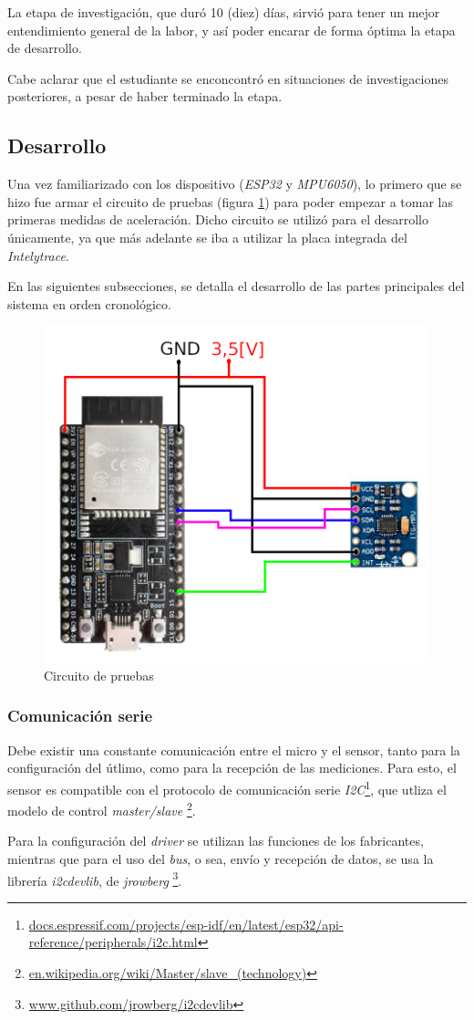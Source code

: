 \documentclass{article}
\newcommand{ \fnidosc }{\footnote{\url{docs.espressif.com/projects/esp-idf/en/latest/esp32/api-reference/peripherals/i2c.html}}}
\newcommand{ \fnmasterslave }{\footnote{\url{en.wikipedia.org/wiki/Master/slave_(technology)}}}
\newcommand{ \fnidoscdevlib }{\footnote{\url{www.github.com/jrowberg/i2cdevlib}}}
\begin{document}
    La etapa de investigación, que duró 10 (diez) días, sirvió para tener un 
    mejor entendimiento general de la labor, y así poder encarar de forma 
    óptima la etapa de desarrollo. \par
    Cabe aclarar que el estudiante se enconcontró en situaciones de 
    investigaciones posteriores, a pesar de haber terminado la etapa.

    \subsection{Desarrollo}
    Una vez familiarizado con los dispositivo (\emph{ESP32} y \emph{MPU6050}),
    lo primero que se hizo fue armar el circuito de pruebas (figura 
    \ref{fig:circuito}) para poder empezar a tomar las primeras medidas de 
    aceleración. Dicho circuito se utilizó para el desarrollo únicamente, ya 
    que más adelante se iba a utilizar la placa integrada del \emph{Intelytrace}.
    \par
    En las siguientes subsecciones, se detalla el desarrollo de las partes 
    principales del sistema en orden cronológico.

    \begin{figure}[h]
        \includegraphics[width=0.9 \textwidth, center]{../primeras/circuito.png}
        \caption{Circuito de pruebas}
        \label{fig:circuito}
    \end{figure}

    \subsubsection{Comunicación serie}
    Debe existir una constante comunicación entre el micro y el sensor, tanto 
    para la configuración del útlimo, como para la recepción de las mediciones.
    Para esto, el sensor es compatible con el protocolo de comunicación serie
    \emph{I2C}\fnidosc, que utliza el modelo de control \emph{master/slave}
    \fnmasterslave. \par
    Para la configuración del \emph{driver} se utilizan las funciones de los
    fabricantes, mientras que para el uso del \emph{bus}, o sea, envío y 
    recepción de datos, se usa la librería \emph{i2cdevlib}, de \emph{jrowberg}
    \fnidoscdevlib.
\end{document}
